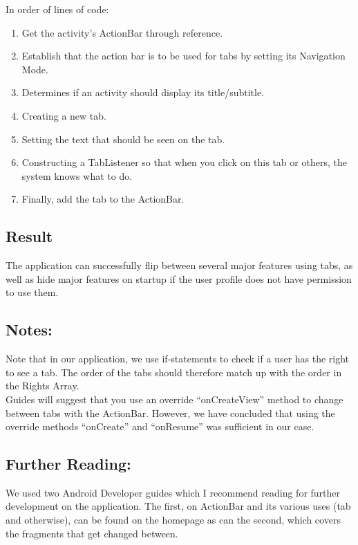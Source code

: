 \noindent In order of lines of code:
\begin{enumerate}
\item Get the activity's ActionBar through reference.
\item Establish that the action bar is to be used for tabs by setting its Navigation Mode.
\item Determines if an activity should display its title/subtitle.
\item Creating a new tab.
\item Setting the text that should be seen on the tab.
\item Constructing a TabListener so that when you click on this tab or others, the system knows what to do.
\item Finally, add the tab to the ActionBar.
\end{enumerate}

\subsection*{Result}
The application can successfully flip between several major features using tabs, as well as hide major features on startup if the user profile does not have permission to use them.

\subsection*{Notes:}
Note that in our application, we use if-statements to check if a user has the right to see a tab.
The order of the tabs should therefore match up with the order in the Rights Array.\\
Guides will suggest that you use an override ``onCreateView'' method to change between tabs with the ActionBar.
However, we have concluded that using the override methods ``onCreate'' and ``onResume'' was sufficient in our case.

\subsection*{Further Reading:}
We used two Android Developer guides which I recommend reading for further development on the application.
The first, on ActionBar and its various uses (tab and otherwise), can be found on the homepage \cite{actionbarguide} as can the second, which covers the fragments that get changed between.\cite{fragmentguide}